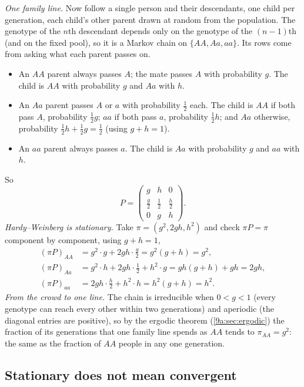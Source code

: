 \emph{One family line.} Now follow a single person and their descendants, one child per
generation, each child's other parent drawn at random from the population. The genotype of the
$n$th descendant depends only on the genotype of the $(n-1)$th (and on the fixed pool), so it is
a Markov chain on $\{AA,Aa,aa\}$. Its rows come from asking what each parent passes on.
\begin{itemize}[itemsep=1pt]
  \item An $AA$ parent always passes $A$; the mate passes $A$ with probability $g$. The child is
        $AA$ with probability $g$ and $Aa$ with $h$.
  \item An $Aa$ parent passes $A$ or $a$ with probability $\tfrac12$ each. The child is $AA$ if
        both pass $A$, probability $\tfrac12g$; $aa$ if both pass $a$, probability $\tfrac12h$;
        and $Aa$ otherwise, probability $\tfrac12h+\tfrac12g=\tfrac12$ (using $g+h=1$).
  \item An $aa$ parent always passes $a$. The child is $Aa$ with probability $g$ and $aa$ with $h$.
\end{itemize}
So
\begin{equation*}
  P=\begin{pmatrix} g&h&0\\ \tfrac g2&\tfrac12&\tfrac h2\\ 0&g&h\end{pmatrix}.
\end{equation*}
\emph{Hardy--Weinberg is stationary.} Take $\pi=(g^2,2gh,h^2)$ and check $\pi P=\pi$ component
by component, using $g+h=1$,
\begin{align*}
  (\pi P)_{AA}&=g^2\cdot g+2gh\cdot\tfrac g2=g^2(g+h)=g^2,\\
  (\pi P)_{Aa}&=g^2\cdot h+2gh\cdot\tfrac12+h^2\cdot g=gh(g+h)+gh=2gh,\\
  (\pi P)_{aa}&=2gh\cdot\tfrac h2+h^2\cdot h=h^2(g+h)=h^2 .
\end{align*}
\emph{From the crowd to one line.} The chain is irreducible when $0<g<1$ (every genotype can
reach every other within two generations) and aperiodic (the diagonal entries are positive), so
by the ergodic theorem (\cref{9a:sec:ergodic}) the fraction of its generations that one family
line spends as $AA$ tends to $\pi_{AA}=g^2$: the same as the fraction of $AA$ people in any one
generation.

\subsection{Stationary does not mean convergent}
\label{9a:sec:not-convergent}

